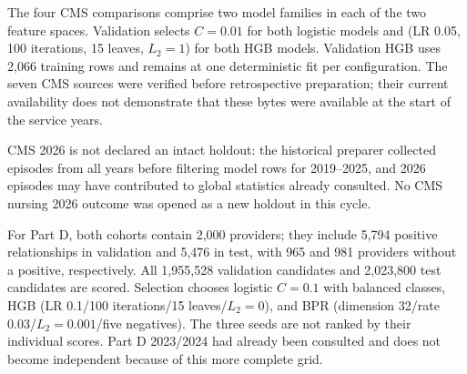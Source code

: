 \begin{table}[!htbp]\centering\small
\caption{New CMS nursing Q2 comparison: ROC-AUC on 2023 validation and 2024, 2025, and pooled tests. The ownership augmentation is not uniformly positive across years; no causal effect or significance level is inferred.}
\label{tab:q2-cms}

\end{table}

The four CMS comparisons comprise two model families in each of the two feature spaces. Validation selects $C=0.01$ for both logistic models and (LR 0.05, 100 iterations, 15 leaves, $L_2=1$) for both HGB models. Validation HGB uses 2,066 training rows and remains at one deterministic fit per configuration. The seven CMS sources were verified before retrospective preparation; their current availability does not demonstrate that these bytes were available at the start of the service years.

CMS 2026 is not declared an intact holdout: the historical preparer collected episodes from all years before filtering model rows for 2019--2025, and 2026 episodes may have contributed to global statistics already consulted. No CMS nursing 2026 outcome was opened as a new holdout in this cycle\cite{hgbq2methods}.

\begin{table}[!htbp]\centering\small
\caption{New Part D Q2 comparison: micro recall@10 in 2023 validation and the 2024 test. Heuristics are untuned; no evaluation candidates are sampled.}
\label{tab:q2-partd}

\end{table}

For Part D, both cohorts contain 2,000 providers; they include 5,794 positive relationships in validation and 5,476 in test, with 965 and 981 providers without a positive, respectively. All 1,955,528 validation candidates and 2,023,800 test candidates are scored. Selection chooses logistic $C=0.1$ with balanced classes, HGB (LR 0.1/100 iterations/15 leaves/$L_2=0$), and BPR (dimension 32/rate 0.03/$L_2=0.001$/five negatives). The three seeds are not ranked by their individual scores. Part D 2023/2024 had already been consulted and does not become independent because of this more complete grid.

\begin{table}[!htbp]\centering\small
\caption{Observed Q2 resources. They describe runs on a shared machine and do not imply equal compute budgets.}
\label{tab:q2-resources}

\end{table}

